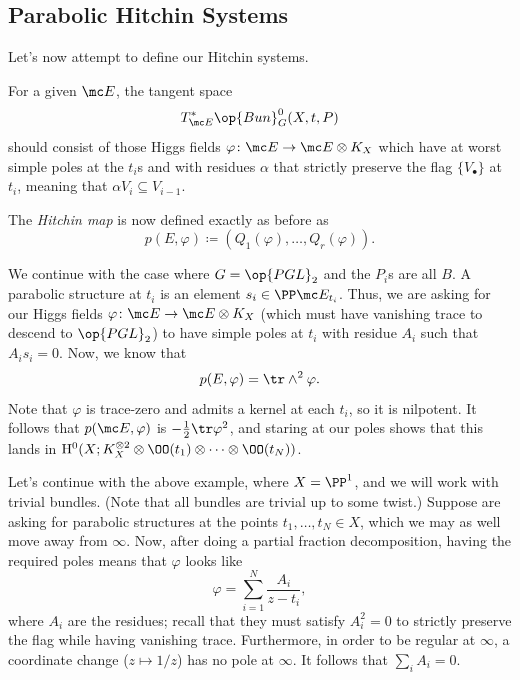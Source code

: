 \documentclass[../notes.tex]{subfiles}
\begin{document}
\subsection{Parabolic Hitchin Systems}
Let's now attempt to define our Hitchin systems.
\begin{remark}
	For a given $\mc E$, the tangent space
	\[T_{\mc E}^*\op{Bun}_G^0(X,t,P)\]
	should consist of those Higgs fields $\varphi\colon\mc E\to\mc E\otimes K_X$ which have at worst simple poles at the $t_i$s and with residues $\alpha$ that strictly preserve the flag $\{V_\bullet\}$ at $t_i$, meaning that $\alpha V_i\subseteq V_{i-1}$.
\end{remark}
\begin{definition}
	The \textit{Hitchin map} is now defined exactly as before as
	\[p(E,\varphi)\coloneqq(Q_1(\varphi),\ldots,Q_r(\varphi)).\]
\end{definition}
\begin{example}
	We continue with the case where $G=\op{PGL}_2$ and the $P_i$s are all $B$. A parabolic structure at $t_i$ is an element $s_i\in\PP\mc E_{t_i}$. Thus, we are asking for our Higgs fields $\varphi\colon\mc E\to\mc E\otimes K_X$ (which must have vanishing trace to descend to $\op{PGL}_2$) to have simple poles at $t_i$ with residue $A_i$ such that $A_is_i=0$. Now, we know that
	\[p(E,\varphi)=\tr\land^2\varphi.\]
	Note that $\varphi$ is trace-zero and admits a kernel at each $t_i$, so it is nilpotent. It follows that $p(\mc E,\varphi)$ is $-\frac12\tr\varphi^2$, and staring at our poles shows that this lands in $\mathrm H^0(X;K_X^{\otimes2}\otimes\OO(t_1)\otimes\cdots\otimes\OO(t_N))$.
\end{example}
Let's continue with the above example, where $X=\PP^1$, and we will work with trivial bundles. (Note that all bundles are trivial up to some twist.) Suppose are asking for parabolic structures at the points $t_1,\ldots,t_N\in X$, which we may as well move away from $\infty$. Now, after doing a partial fraction decomposition, having the required poles means that $\varphi$ looks like
\[\varphi=\sum_{i=1}^N\frac{A_i}{z-t_i},\]
where $A_i$ are the residues; recall that they must satisfy $A_i^2=0$ to strictly preserve the flag while having vanishing trace. Furthermore, in order to be regular at $\infty$, a coordinate change ($z\mapsto1/z$) has no pole at $\infty$. It follows that $\sum_iA_i=0$.
\end{document}
